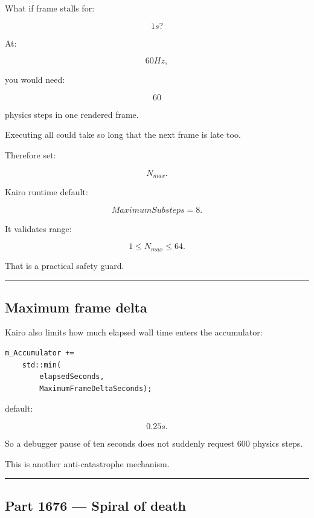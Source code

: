 \hypertarget{06-engine-ii-ch037-part-1675-maximum-substep-budgets}{}

What if frame stalls for:

\[
1s?
\]

At:

\[
60Hz,
\]

you would need:

\[
60
\]

physics steps in one rendered frame.

Executing all could take so long that the next frame is late too.

Therefore set:

\[
N_{max}.
\]

Kairo runtime default:

\[
\boxed{
MaximumSubsteps=8.
}
\]

It validates range:

\[
1\le N_{max}\le64.
\]

That is a practical safety guard.

\begin{center}\rule{0.5\linewidth}{0.5pt}\end{center}

\subsection{Maximum frame delta}\label{06-engine-ii-ch037-maximum-frame-delta}

\hypertarget{06-engine-ii-ch037-maximum-frame-delta}{}

Kairo also limits how much elapsed wall time enters the accumulator:

\begin{verbatim}
m_Accumulator +=
    std::min(
        elapsedSeconds,
        MaximumFrameDeltaSeconds);
\end{verbatim}

default:

\[
0.25s.
\]

So a debugger pause of ten seconds does not suddenly request 600 physics steps.

This is another anti-catastrophe mechanism.

\begin{center}\rule{0.5\linewidth}{0.5pt}\end{center}

\subsection{Part 1676 --- Spiral of death}\label{06-engine-ii-ch037-part-1676-spiral-of-death}

